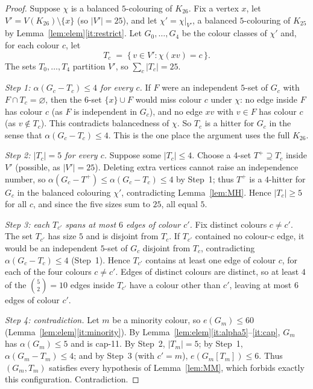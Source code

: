 \documentclass[11pt,reqno]{amsart}
\theoremstyle{definition}
\theoremstyle{remark}
\newcommand{\abs}[1]{\left|#1\right|}
\newcommand{\capeleven}{\textsf{cap-11}}
\begin{document}
\begin{proof}
Suppose $\chi$ is a balanced $5$-colouring of $K_{26}$. Fix a vertex $x$, let
$V'=V(K_{26})\setminus\{x\}$ (so $\abs{V'}=25$), and let $\chi'=\chi|_{V'}$, a
balanced $5$-colouring of $K_{25}$ by Lemma~\ref{lem:elem}\ref{it:restrict}. Let
$G_0,\dots,G_4$ be the colour classes of $\chi'$ and, for each colour $c$, let
\[
  T_c \;=\; \{\, v\in V' : \chi(xv)=c \,\}.
\]
The sets $T_0,\dots,T_4$ partition $V'$, so $\sum_c\abs{T_c}=25$.

\smallskip
\noindent\emph{Step 1: $\alpha(G_c-T_c)\le 4$ for every $c$.}
If $F$ were an independent $5$-set of $G_c$ with $F\cap T_c=\varnothing$, then the
$6$-set $\{x\}\cup F$ would miss colour $c$ under $\chi$: no edge inside $F$ has
colour $c$ (as $F$ is independent in $G_c$), and no edge $xv$ with $v\in F$ has
colour $c$ (as $v\notin T_c$). This contradicts balancedness of $\chi$. So $T_c$ is
a hitter for $G_c$ in the sense that $\alpha(G_c-T_c)\le 4$. This is the one place
the argument uses the full $K_{26}$.

\smallskip
\noindent\emph{Step 2: $\abs{T_c}=5$ for every $c$.}
Suppose some $\abs{T_c}\le 4$. Choose a $4$-set $T^+\supseteq T_c$ inside $V'$
(possible, as $\abs{V'}=25$). Deleting extra vertices cannot raise an independence
number, so $\alpha(G_c-T^+)\le\alpha(G_c-T_c)\le 4$ by Step~1; thus $T^+$ is a
$4$-hitter for $G_c$ in the balanced colouring $\chi'$, contradicting
Lemma~\ref{lem:MH}. Hence $\abs{T_c}\ge 5$ for all $c$, and since the five sizes sum
to $25$, all equal $5$.

\smallskip
\noindent\emph{Step 3: each $T_{c'}$ spans at most $6$ edges of colour $c'$.}
Fix distinct colours $c\ne c'$. The set $T_{c'}$ has size $5$ and is disjoint from
$T_c$. If $T_{c'}$ contained no colour-$c$ edge, it would be an independent $5$-set
of $G_c$ disjoint from $T_c$, contradicting $\alpha(G_c-T_c)\le 4$ (Step~1). Hence
$T_{c'}$ contains at least one edge of colour $c$, for each of the four colours
$c\ne c'$. Edges of distinct colours are distinct, so at least $4$ of the
$\binom 52=10$ edges inside $T_{c'}$ have a colour other than $c'$, leaving at most
$6$ edges of colour $c'$.

\smallskip
\noindent\emph{Step 4: contradiction.}
Let $m$ be a minority colour, so $e(G_m)\le 60$
(Lemma~\ref{lem:elem}\ref{it:minority}). By
Lemma~\ref{lem:elem}\ref{it:alpha5}--\ref{it:cap}, $G_m$ has $\alpha(G_m)\le 5$ and
is \capeleven. By Step~2, $\abs{T_m}=5$; by Step~1, $\alpha(G_m-T_m)\le 4$; and by
Step~3 (with $c'=m$), $e(G_m[T_m])\le 6$. Thus $(G_m,T_m)$ satisfies every
hypothesis of Lemma~\ref{lem:MM}, which forbids exactly this configuration.
Contradiction.
\end{proof}
\end{document}
